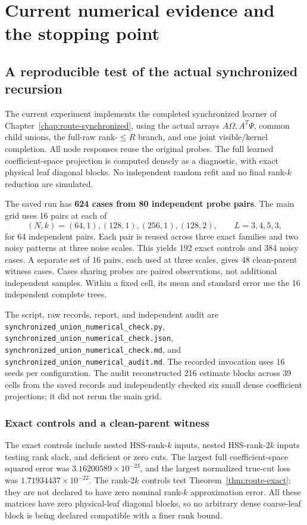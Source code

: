 \documentclass[11pt,oneside,openany,a4paper]{report}
\numberwithin{equation}{chapter}
\theoremstyle{definition}
\theoremstyle{remark}
\newcommand{\sourcefile}[1]{{\small\nolinkurl{#1}}}
\begin{document}
\chapter{Current numerical evidence and the stopping point}
\label{chap:route-evidence}

\section{A reproducible test of the actual synchronized recursion}

The current experiment implements the completed synchronized learner
of Chapter~\ref{chap:route-synchronized}, using the actual arrays
$A\Omega,A^T\Psi$, common child unions, the full-raw rank-$\leq R$
branch, and one joint visible/kernel completion.  All node responses
reuse the original probes.  The full learned coefficient-space
projection is computed densely as a diagnostic, with exact physical
leaf diagonal blocks.  No independent random refit and no final
rank-$k$ reduction are simulated.

The saved run has \textbf{624 cases from 80 independent probe pairs}.
The main grid uses 16 pairs at each of
\[
 (N,k)=(64,1),(128,1),(256,1),(128,2),
 \qquad L=3,4,5,3,
\]
for 64 independent pairs.  Each pair is reused across three exact
families and two noisy patterns at three noise scales.  This yields
192 exact controls and 384 noisy cases.  A separate set of 16 pairs,
each used at three scales, gives 48 clean-parent witness cases.
Cases sharing probes are paired observations, not additional
independent samples.  Within a fixed cell, its mean and standard error
use the 16 independent complete trees.

The script, raw records, report, and independent audit are
\sourcefile{synchronized_union_numerical_check.py},
\sourcefile{synchronized_union_numerical_check.json},
\sourcefile{synchronized_union_numerical_check.md}, and
\sourcefile{synchronized_union_numerical_audit.md}.  The recorded
invocation uses 16 seeds per configuration.  The audit reconstructed
216 estimate blocks across 39 cells from the saved records and
independently checked six small dense coefficient projections; it did
not rerun the main grid.

\subsection{Exact controls and a clean-parent witness}

The exact controls include nested HSS-rank-$k$ inputs, nested
HSS-rank-$2k$ inputs testing rank slack, and deficient or zero cuts.
The largest full coefficient-space squared error was
$3.16200589\times10^{-23}$, and the largest normalized true-cut loss
was $1.71934437\times10^{-22}$.  The rank-$2k$ controls test
Theorem~\ref{thm:route-exact}; they are not declared to have zero
nominal rank-$k$ approximation error.  All these matrices have zero
physical-leaf diagonal blocks, so no arbitrary dense coarse-leaf block
is being declared compatible with a finer rank bound.
\end{document}
